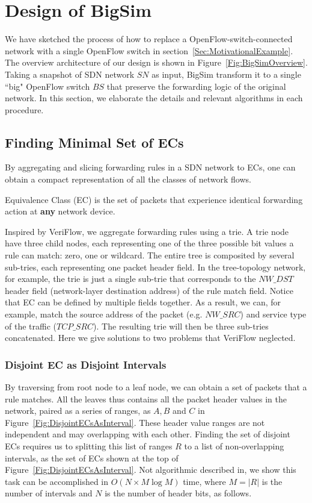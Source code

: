 \section{Design of BigSim}
\label{Sec:Design}

We have sketched the process of how to replace a OpenFlow-switch-connected network
with a single OpenFlow switch in section~\ref{Sec:MotivationalExample}.
The overview architecture of our design is shown in Figure~\ref{Fig:BigSimOverview}.
Taking a snapshot of SDN network $SN$ as input, BigSim transform it to a single ``big"
OpenFlow switch $BS$ that preserve the forwarding logic of the original network.
In this section, we elaborate the details and relevant algorithms
in each procedure.

\subsection{Finding Minimal Set of ECs}
By aggregating and slicing forwarding rules in a SDN network to ECs,
one can obtain a compact representation of all the classes of network flows.
\begin{definition}
Equivalence Class (EC) is the set of packets that
experience identical forwarding action at \textbf{any} network device.
\label{Def:EC}
\end{definition}

Inspired by VeriFlow\cite{Veriflow}, we aggregate forwarding rules using a trie.
A trie node have three child nodes, each representing one of the three possible
bit values a rule can match: zero, one or wildcard.
The entire tree is composited by several sub-tries,
each representing one packet header field.
In the tree-topology network, for example, the trie is just a single sub-trie that
corresponds to the $NW\_DST$ header field (network-layer destination address)
of the rule match field.
Notice that EC can be defined by multiple fields together.
As a result, we can, for example, match the source address of the packet (e.g. $NW\_SRC$)
and service type of the traffic ($TCP\_SRC$).
The resulting trie will then be three sub-tries concatenated.
Here we give solutions to two problems that VeriFlow neglected.

\subsubsection{Disjoint EC as Disjoint Intervals}
By traversing from root node to a leaf node, we can obtain a set of packets
that a rule matches.
All the leaves thus contains all the packet header values in the network,
paired as a series of ranges, as $A, B$ and $C$ in Figure~\ref{Fig:DisjointECsAsInterval}.
These header value ranges are not independent and may overlapping with each other.
Finding the set of disjoint ECs requires us to splitting this list of ranges $R$ to
a list of non-overlapping intervals,
as the set of ECs shown at the top of Figure~\ref{Fig:DisjointECsAsInterval}.
Not algorithmic described in\cite{Veriflow},
we show this task can be accomplished in $O(N \times M\log M)$ time,
where $M=|R|$ is the number of intervals and $N$ is the number of header bits,
as follows\cite{SplitDisjointInterval}.

